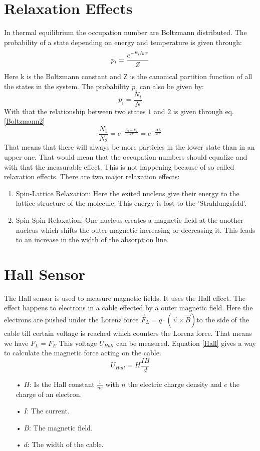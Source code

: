 \section{Relaxation Effects}
In thermal equilibrium the occupation number are Boltzmann distributed.
The probability of a state depending on energy and temperature is given through:
\begin{equation}
p_i=\frac{e^{\nicefrac{-E_i}{kT}}}{Z}
\label{Boltzmann}
\end{equation}
Here k is the Boltzmann constant and Z is the canonical partition function of all the states in the system. The probability $p_i$ can also be given by: $$p_i=\frac{N_i}{N}$$ With that the relationship between two states $1$ and $2$ is given through eq.\ref{Boltzmann2}
\begin{equation}
\frac{N_1}{N_2}=e^{-\frac{E_1-E_2}{kT}}=e^{-\frac{\Delta E}{kT}}
\label{Boltzmann2}
\end{equation}
That means that there will always be more particles in the lower state than in an upper one. That would mean that the occupation numbers should equalize and with that the measurable effect. This is not happening because of so called relaxation effects. There are two major relaxation effects:
\begin{enumerate}
	\item Spin-Lattice Relaxation: Here the exited nucleus give their energy to the lattice structure of the molecule. This energy is lost to the 'Strahlungsfeld'.
	\item Spin-Spin Relaxation: One nucleus creates a magnetic field at the another nucleus which shifts the outer magnetic increasing or decreasing it. This leads to an increase in the width of the absorption line.
\end{enumerate} 
\section{Hall Sensor}
The Hall sensor is used to measure magnetic fields. It uses the Hall effect. The effect happens to electrons in a cable effected by a outer magnetic field. Here the electrons are pushed under the Lorenz force $\vec{F}_L=q\cdot(\vec{v}\times \vec{B})$to the side of the cable till certain voltage is reached which counters the Lorenz force. That means we have $F_L=F_E$ This voltage $U_{Hall}$ can be measured. Equation \ref{Hall} gives a way to calculate the magnetic force acting on the cable. 
\begin{equation}
U_{Hall}=H\frac{IB}{d}
\label{Hall}
\end{equation}
\begin{enumerate}
	\item[•] $H$: Is the Hall constant $\frac{1}{ne}$ with $n$ the electric charge density and $e$ the charge of an electron.
	\item[•] $I$: The current.
	\item[•] $B$: The magnetic field.
	\item[•] $d$: The width of the cable.
\end{enumerate}
